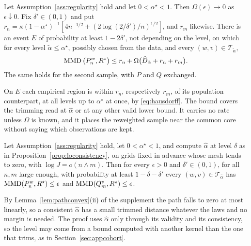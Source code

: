 \begin{proposition}
\label{prop:alphahat}
Let Assumption~\ref{ass:regularity} hold and let $0<\alpha^\star<1$. Then $\Omega(\epsilon)\to0$ as
$\epsilon\downarrow0$. Fix $\delta'\in(0,1)$ and put $r_n=\kappa(1-\alpha^\star)^{-1}[4n^{-1/2}+(2\log(2/\delta')/n)^{1/2}]$,
and $r_m$ likewise. There is an event $E$ of probability at least $1-2\delta'$, not depending on the level, on which for
every level $\tilde\alpha\le\alpha^\star$, possibly chosen from the data, and every $(w,v)\in\mathcal T_{\tilde\alpha}$,
\[
\operatorname{MMD}\big(P_n^w,R^\star\big)\le r_n+\Omega\big(\widehat D_{\tilde\alpha}+r_n+r_m\big).
\]
The same holds for the second sample, with $P$ and $Q$ exchanged.
\end{proposition}

On $E$ each empirical region is within $r_n$, respectively $r_m$, of its population counterpart, at all levels up to
$\alpha^\star$ at once, by \eqref{eq:hausdorff}. The bound covers the trimming read at $\widehat\alpha$ or at any other
valid lower bound. It carries no rate unless $\Omega$ is known, and it places the reweighted sample near the common core
without saying which observations are kept.

\begin{corollary}
\label{cor:alphalo}
Let Assumption~\ref{ass:regularity} hold, let $0<\alpha^\star<1$, and compute $\widehat\alpha$ at level
$\delta$ as in Proposition~\ref{prop:loconsistency}, on grids fixed in advance whose mesh tends to zero, with
$\log J=o(n\wedge m)$. Then for every $\epsilon>0$ and $\delta'\in(0,1)$, for all $n,m$ large enough, with probability
at least $1-\delta-\delta'$ every $(w,v)\in\mathcal T_{\widehat\alpha}$ has
$\operatorname{MMD}(P_n^w,R^\star)\le\epsilon$ and $\operatorname{MMD}(Q_m^v,R^\star)\le\epsilon$.
\end{corollary}

By Lemma~\ref{lem:pathconvex}(ii) of the supplement the path falls to zero at most linearly, so a consistent
$\widehat\alpha$ has a small trimmed distance whatever the laws and no margin is needed. The proof uses
$\widehat\alpha$ only through its validity and its consistency, so the level may come from a bound computed with
another kernel than the one that trims, as in Section~\ref{sec:appcohort}.
